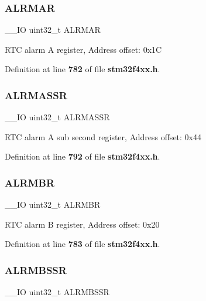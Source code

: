 \subsubsection{A\+L\+R\+M\+AR}
{\footnotesize\ttfamily \+\_\+\+\_\+\+IO uint32\+\_\+t A\+L\+R\+M\+AR}

R\+TC alarm A register, Address offset\+: 0x1C 

Definition at line \textbf{ 782} of file \textbf{ stm32f4xx.\+h}.

\mbox{\label{structRTC__TypeDef_a61282fa74cede526af85fd9d20513646}} 
\subsubsection{A\+L\+R\+M\+A\+S\+SR}
{\footnotesize\ttfamily \+\_\+\+\_\+\+IO uint32\+\_\+t A\+L\+R\+M\+A\+S\+SR}

R\+TC alarm A sub second register, Address offset\+: 0x44 

Definition at line \textbf{ 792} of file \textbf{ stm32f4xx.\+h}.

\mbox{\label{structRTC__TypeDef_a4e513deb9f58a138ad9f317cc5a3555d}} 
\subsubsection{A\+L\+R\+M\+BR}
{\footnotesize\ttfamily \+\_\+\+\_\+\+IO uint32\+\_\+t A\+L\+R\+M\+BR}

R\+TC alarm B register, Address offset\+: 0x20 

Definition at line \textbf{ 783} of file \textbf{ stm32f4xx.\+h}.

\mbox{\label{structRTC__TypeDef_a4ef7499da5d5beb1cfc81f7be057a7b2}} 
\subsubsection{A\+L\+R\+M\+B\+S\+SR}
{\footnotesize\ttfamily \+\_\+\+\_\+\+IO uint32\+\_\+t A\+L\+R\+M\+B\+S\+SR}

